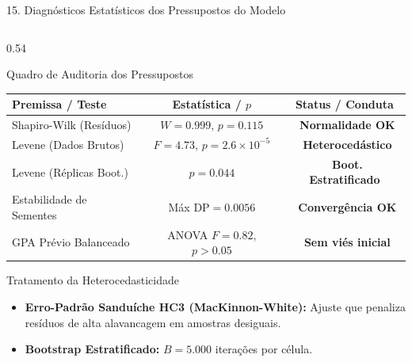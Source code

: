 \documentclass[aspectratio=169, 10pt]{beamer}
\newcommand{\cmark}{\textcolor{StatusGreen}{\ding{51}}}
\newcommand{\tmark}{\textcolor{StatusAmber}{\ding{115}}}
\begin{document}
\begin{frame}{15. Diagnósticos Estatísticos dos Pressupostos do Modelo}
    \begin{columns}[T]
        \begin{column}{0.54\textwidth}
            \begin{block}{Quadro de Auditoria dos Pressupostos}
                \centering \small
                \begin{tabular}{lcc}
                    \toprule
                    \textbf{Premissa / Teste} & \textbf{Estatística / $p$} & \textbf{Status / Conduta} \\
                    \midrule
                    Shapiro-Wilk (Resíduos) & $W = 0.999$, $p = 0.115$ & \cmark\ \textbf{Normalidade OK} \\
                    Levene (Dados Brutos) & $F = 4.73$, $p = 2.6 \times 10^{-5}$ & \tmark\ \textbf{Heterocedástico} \\
                    Levene (Réplicas Boot.) & $p = 0.044$ & \tmark\ \textbf{Boot. Estratificado} \\
                    Estabilidade de Sementes & Máx $\text{DP} = 0.0056$ & \cmark\ \textbf{Convergência OK} \\
                    GPA Prévio Balanceado & ANOVA $F=0.82$, $p > 0.05$ & \cmark\ \textbf{Sem viés inicial} \\
                    \bottomrule
                \end{tabular}
            \end{block}

            \begin{block}{Tratamento da Heterocedasticidade}
                \begin{itemize}\footnotesize
                    \item \textbf{Erro-Padrão Sanduíche HC3 (MacKinnon-White):} Ajuste que penaliza resíduos de alta alavancagem em amostras desiguais.
                    \item \textbf{Bootstrap Estratificado:} $B=5.000$ iterações por célula.
                \end{itemize}
            \end{block}
        \end{column}


\end{columns}
\end{frame}
\end{document}

